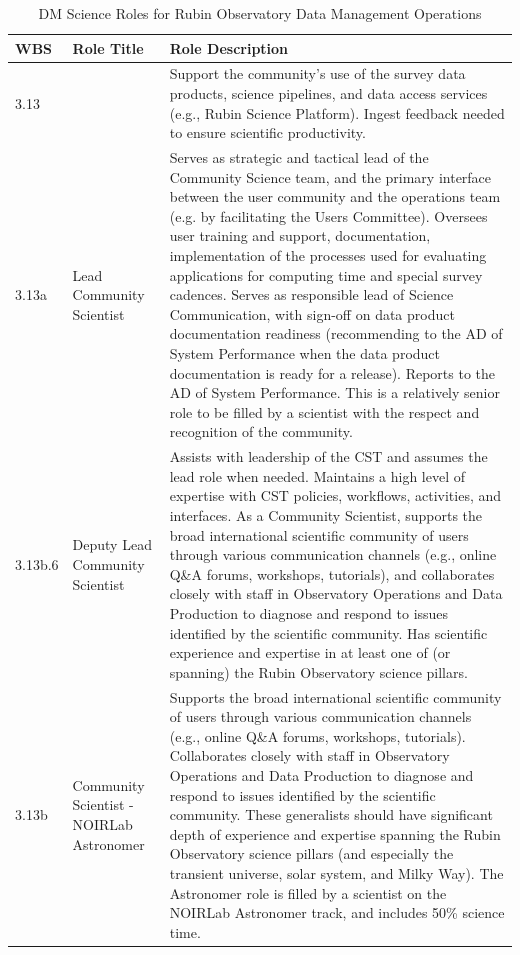 \normalsize \begin{longtable} {|p{}|p{}|p{}|} \caption{DM Science Roles for Rubin Observatory Data Management Operations \label{tab:dmsciroles}}\\ 
\hline 
\textbf{WBS}&\textbf{Role Title}&\textbf{Role Description} \\ \hline
{3.13}&{}&{Support the community's use of the survey data products, science pipelines, and data access services (e.g., Rubin Science Platform). Ingest feedback needed to ensure scientific productivity.} \\ \hline
{3.13a}&{Lead Community Scientist}&{Serves as strategic and tactical lead of the Community Science team, and the primary interface between the user community  and the operations team (e.g. by facilitating the Users Committee). Oversees user training and support, documentation, implementation of the processes used for evaluating applications for computing time and special survey cadences.  Serves as responsible lead of Science Communication, with sign-off on data product documentation readiness (recommending to the AD of System Performance when the data product documentation is ready for a release).  Reports to the AD of System Performance. This is a relatively senior role to be filled by a scientist with the respect and recognition of the community. } \\ \hline
{3.13b.6}&{Deputy Lead Community Scientist}&{Assists with leadership of the CST and assumes the lead role when needed. Maintains a high level of expertise with CST policies, workflows, activities, and interfaces. As a Community Scientist, supports the broad international scientific community of users through various communication channels (e.g., online Q\&A forums, workshops, tutorials), and collaborates closely with staff in Observatory Operations and Data Production to diagnose and respond to issues identified by the scientific community.  Has scientific experience and expertise in at least one of (or spanning) the Rubin Observatory science pillars. } \\ \hline
{3.13b}&{Community Scientist - NOIRLab Astronomer}&{Supports the broad international scientific community of users through various communication channels (e.g., online Q\&A forums, workshops, tutorials). Collaborates closely with staff in Observatory Operations and Data Production to diagnose and respond to issues identified by the scientific community.  These generalists should have significant depth of experience and expertise spanning the Rubin Observatory science pillars (and especially the transient universe, solar system, and Milky Way). The Astronomer role is filled by a scientist on the NOIRLab Astronomer track, and includes 50\% science time. } \\ \hline

\end{longtable}
